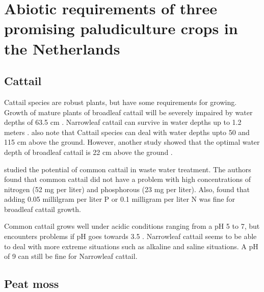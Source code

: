 {\section{Abiotic requirements of three promising paludiculture crops in the Netherlands}

\subsection{Cattail}


Cattail species are robust plants, but have some requirements for growing. Growth of mature plants of broadleaf cattail will be severely impaired by water depths of 63.5 cm \citep{morton1975cattails}. Narrowleaf cattail can survive in water depths up to 1.2 meters \citep{morton1975cattails}. \citet{dubbe1988production} also note that Cattail species can deal with water depths upto 50 and 115 cm above the ground. However, another study showed that the optimal water depth of broadleaf cattail is 22 cm above the ground \citep{grace1989effects}.

\citet{ciria2005Typha} studied the potential of common cattail in waste water treatment. The authors found that common cattail did not have a problem with high concentrations of nitrogen (52 mg per liter) and phosphorous (23 mg per liter). Also, \citet{newman1996effects} found that adding 0.05 millilgram per liter P or 0.1 milligram per liter N was fine for broadleaf cattail growth.

Common cattail grows well under acidic conditions ranging from a pH 5 to 7, but encounters problems if pH goes towards 3.5 \citep{brix2002typha}. Narrowleaf cattail seems to be able to deal with more extreme situations such as alkaline and saline situations. A pH of 9 can still be fine for Narrowleaf cattail.



\subsection{Peat moss}

}
